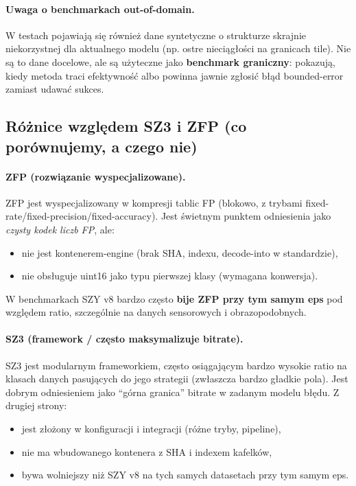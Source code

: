 \documentclass[11pt,a4paper]{article}
\begin{document}
\paragraph{Uwaga o benchmarkach out-of-domain.}
W testach pojawiają się również dane syntetyczne o strukturze skrajnie niekorzystnej dla aktualnego modelu (np. ostre nieciągłości na granicach tile). Nie są to dane docelowe, ale są użyteczne jako \textbf{benchmark graniczny}: pokazują, kiedy metoda traci efektywność albo powinna jawnie zgłosić błąd bounded-error zamiast udawać sukces.

\subsection{Różnice względem SZ3 i ZFP (co porównujemy, a czego nie)}
\paragraph{ZFP (rozwiązanie wyspecjalizowane).}
ZFP \cite{zfp} jest wyspecjalizowany w kompresji tablic FP (blokowo, z trybami fixed-rate/fixed-precision/fixed-accuracy). Jest świetnym punktem odniesienia jako \emph{czysty kodek liczb FP}, ale:
\begin{itemize}
  \item nie jest kontenerem-engine (brak SHA, indexu, decode-into w standardzie),
  \item nie obsługuje uint16 jako typu pierwszej klasy (wymagana konwersja).
\end{itemize}
W benchmarkach SZY v8 bardzo często \textbf{bije ZFP przy tym samym eps} pod względem ratio, szczególnie na danych sensorowych i obrazopodobnych.

\paragraph{SZ3 (framework / często maksymalizuje bitrate).}
SZ3 \cite{sz3} jest modularnym frameworkiem, często osiągającym bardzo wysokie ratio na klasach danych pasujących do jego strategii (zwłaszcza bardzo gładkie pola). Jest dobrym odniesieniem jako ``górna granica'' bitrate w zadanym modelu błędu. 
Z drugiej strony:
\begin{itemize}
  \item jest złożony w konfiguracji i integracji (różne tryby, pipeline),
  \item nie ma wbudowanego kontenera z SHA i indexem kafelków,
  \item bywa wolniejszy niż SZY v8 na tych samych datasetach przy tym samym eps.
\end{itemize}
\end{document}
